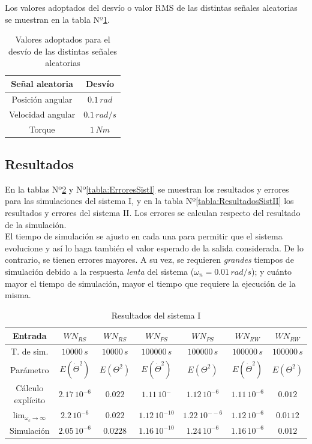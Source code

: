 \documentclass[a4paper,11pt,twoside]{IT-CNEA}
\begin{document}
\par Los valores adoptados del desvío o valor RMS de las distintas señales aleatorias se muestran en la tabla Nº\ref{tabla:RMSruidos}.
\begin{table}[h!]
\centering
\caption{Valores adoptados para el desvío de las distintas señales aleatorias}
\label{tabla:RMSruidos}
\begin{tabular}{|c|c|}
\hline
Señal aleatoria & Desvío \\ \hline
Posición angular&$0.1\,rad$ \\ \hline
Velocidad angular&$0.1\,rad/s$ \\ \hline
Torque&$1\,Nm$ \\ \hline
\end{tabular}
\end{table}
\subsection{Resultados}
En la tablas Nº\ref{tabla:ResultadosSistI} y Nº\ref{tabla:ErroresSistI} se muestran los resultados y errores para las simulaciones del sistema I, y en la tabla Nº\ref{tabla:ResultadosSistII} los resultados y errores del sistema II. Los errores se calculan respecto del resultado de la simulación. 
\\El tiempo de simulación se ajusto en cada una para permitir que el sistema evolucione y así lo haga también el valor esperado de la salida considerada. De lo contrario, se tienen errores mayores. A su vez, se requieren \textit{grandes} tiempos de simulación debido a la respuesta \textit{lenta} del sistema ($\omega_n=0.01\,rad/s$); y cuánto mayor el tiempo de simulación, mayor el tiempo que requiere la ejecución de la misma. 
\begin{table}[h!]
\centering
\caption{Resultados del sistema I}
\label{tabla:ResultadosSistI}
\begin{tabular}{|c|c|c|c|c|c|c|}
\hline
Entrada  & $WN_{RS}$ & $WN_{RS}$& $WN_{PS}$& $WN_{PS}$& $WN_{RW}$&$WN_{RW}$\\ \hline
T. de sim.&$10000\,s$&$10000\,s$&$100000\,s$&$100000\,s$&$100000\,s$&$100000\,s$ \\ \hline
Parámetro & $E\left( \dot{\Theta}^2 \right)$ & $E\left( \Theta^2\right)$& $E\left( \dot{\Theta}^2 \right)$ & $E\left( \Theta^2\right)$& $E\left( \dot{\Theta}^2 \right)$ & $E\left( \Theta^2\right)$  \\ \hline
Cálculo explícito&$2.17\,10^{-6}$&$0.022$&$1.11\,10^{-}$&$1.12\,10^{-6}$&$1.11\,10^{-6}$&$0.012$\\ \hline
$\lim_{\omega_c\to\infty}$&$2.2\,10^{-6}$&$0.022$&$1.12\,10^{-10}$&$1.22\,10^{--6}$&$1.12\,10^{-6}$&$0.0112$ \\ \hline
Simulación&$2.05\,10^{-6}$&$0.0228$&$1.16\,10^{-10}$&$1.24\,10^{-6}$&$1.16\,10^{-6}$&$0.012$ \\ \hline
\end{tabular}
\end{table}
\end{document}
